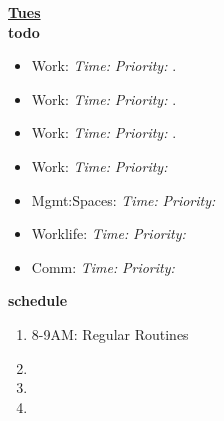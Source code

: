 \documentclass[11pt]{article}
\newcommand{\timeEst}[1]{\textit{Time:} \textit{#1}}
\newcommand{\priority}[1]{\textit{Priority:} \textit{#1}}
\newcommand{\deadline}[1]{#1}
\begin{document}
{            \textbf{\small \underline{Tues}} \\
            \textbf{\small todo} \\
            \begin{itemize}
              \tiny \item \tiny Work:                                      \deadline{} \timeEst{} \priority{}. 
            \item \tiny Work:                                              \deadline{ }   \timeEst{}  \priority{}.
            \item \tiny Work:                                              \deadline{ }   \timeEst{}  \priority{}. 
            \item \tiny Work:                                              \deadline{} \timeEst{} \priority{} 
            \item \tiny Mgmt:Spaces:                                       \deadline{} \timeEst{} \priority{} 
            \item \tiny Worklife:                                          \deadline{} \timeEst{} \priority{} 
            \item \tiny Comm:                                              \deadline{} \timeEst{} \priority{} 
            \end{itemize} 
            \textbf{\small schedule} \\
            \begin{enumerate}
              \tiny \item \tiny 8-9AM: Regular Routines 
            \item \tiny 
            \item \tiny 
            \item \tiny   
            \end{enumerate} 

}
\end{document}
